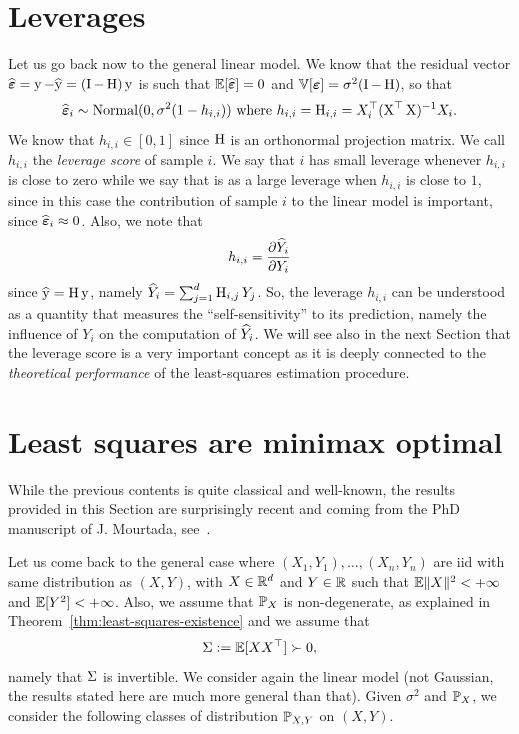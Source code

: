 \section{Leverages} %
\label{sec:leverages}

Let us go back now to the general linear model.
We know that the residual vector $\wh \beps = \by - \wh \by = (\bI - \bH) \by$ is such that $\E[\wh \beps] = 0$ and $\var[\beps] = \sigma^2 (\bI - \bH)$, so that
\begin{equation*}
	\wh \beps_i \sim \nor(0, \sigma^2 (1 - h_{i,i})) \text{ where } h_{i, i} = \bH_{i, i} = X_i^\top (\bX^\top \bX)^{-1} X_i.
\end{equation*}
We know that $h_{i, i} \in [0, 1]$ since $\bH$ is an orthonormal projection matrix.%
We call $h_{i, i}$ the \emph{leverage score} of sample $i$. We say that $i$ has small leverage whenever $h_{i, i}$ is close to zero while we say that is as a large leverage when $h_{i, i}$ is close to $1$, since in this case the contribution of sample $i$ to the linear model is important, since $\wh \beps_i \approx 0$.
Also, we note that 
\begin{equation*}
	h_{i, i} = \frac{\partial \wh Y_i}{\partial Y_i}
\end{equation*}
since $\wh \by = \bH \by$, namely $\wh Y_i = \sum_{j=1}^d \bH_{i, j} Y_j$.
So, the leverage $h_{i, i}$ can be understood as a quantity that measures the ``self-sensitivity'' to its prediction, namely the influence of $Y_i$ on the computation of $\wh Y_i$.
We will see also in the next Section that the leverage score is a very important concept as it is deeply connected to the \emph{theoretical performance} of the least-squares estimation procedure.

\section{Least squares are minimax optimal} %
\label{sec:optimality_of_the_least_squares}


While the previous contents is quite classical and well-known, the results provided in this Section are surprisingly recent and coming from the PhD manuscript of J. Mourtada, see~.

Let us come back to the general case where $(X_1, Y_1), \ldots, (X_n, Y_n)$ are iid with same distribution as $(X, Y)$, with $X \in \R^d$ and $Y \in \R$ such that $\E \norm{X}^2 < +\infty$ and $\E[Y^2] < +\infty$. 
Also, we assume that $\P_X$ is non-degenerate, as explained in Theorem~\ref{thm:least-squares-existence} and we assume that
\begin{equation*}
	\bSigma := \E[X X^\top] \succ 0,
\end{equation*}
namely that $\bSigma$ is invertible.
We consider again the linear model (not Gaussian, the results stated here are much more general than that).
Given $\sigma^2$ and $\P_X$, we consider the following classes of distribution $\P_{X, Y}$ on $(X, Y)$.

